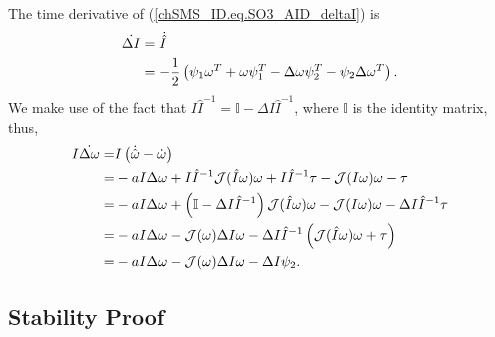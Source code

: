 The time derivative of (\ref{chSMS_ID.eq.SO3_AID_deltaI}) is 
%
\begin{align}\label{chSMS_ID.eq.SO3_AID_deltaIdot}
\dot{\Delta I}&=\dot{\hat{I}} \nonumber \\
              &=-\frac{1}{2}\left(\psi_1 \omega^T +\omega \psi_1^T 
               -\Delta\omega \psi_2^T-\psi_2 \Delta\omega^T\right).
\end{align}
%
We make use of the fact that $I \hat{I}^{-1}=
\mathbb{I} - \Delta I \hat{I}^{-1}$, where $\mathbb{I}$ is the identity
matrix, thus, 
%
 \begin{align}\label{chSMS_ID.eq.SO3_AID_Ideltawdot}
I\dot{\Delta \omega}
 =&I\left(\dot{\hat{\omega}} - \dot{\omega}\right)
\nonumber \\
 =&-a I \Delta \omega+I \hat{I}^{-1}\mathcal{J}(\hat{I}\omega)\omega
   +I\hat{I}^{-1} \tau-\mathcal{J}(I\omega)\omega-\tau  
\nonumber \\
 =&-a I \Delta\omega+\left(\mathbb{I}-\Delta I\hat{I}^{-1}\right)
    \mathcal{J}(\hat{I}\omega)\omega-\mathcal{J}(I\omega)\omega
   -\Delta I \hat{I}^{-1} \tau
\nonumber \\
 =&-a I \Delta\omega-\mathcal{J}(\omega)\Delta I \omega 
   -\Delta I\hat{I}^{-1}\left(\mathcal{J}(\hat{I}\omega)\omega+\tau\right)
\nonumber \\
 =&-a I \Delta\omega-\mathcal{J}(\omega)\Delta I \omega
   -\Delta I \psi_2.
\end{align}


\subsection{Stability Proof}\label{chSMS_ID.sec.SO3_AID_proof}

